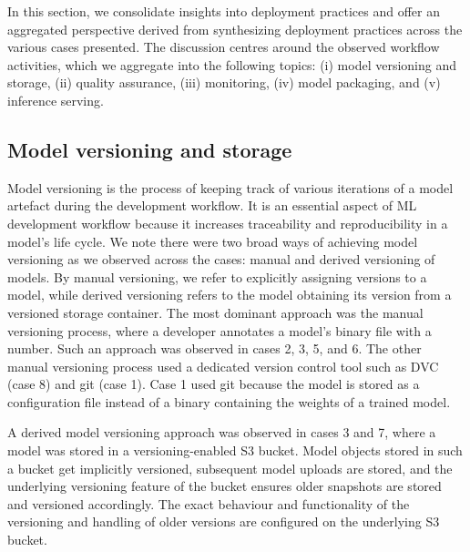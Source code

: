 In this section, we consolidate insights into deployment practices and offer an aggregated perspective derived from synthesizing deployment practices across the various cases presented. The discussion centres around the observed workflow activities, which we aggregate into the following topics: (i) model versioning and storage, (ii) quality assurance, (iii) monitoring, (iv) model packaging, and (v) inference serving. 


\subsection{Model versioning and storage}
Model versioning is the process of keeping track of various iterations of a model artefact during the development workflow. It is an essential aspect of ML development workflow because it increases traceability and reproducibility in a model's life cycle. We note there were two broad ways of achieving model versioning as we observed across the cases: manual and derived versioning of models. By manual versioning, we refer to explicitly assigning versions to a model, while derived versioning refers to the model obtaining its version from a versioned storage container. The most dominant approach was the manual versioning process, where a developer annotates a model's binary file with a number. Such an approach was observed in cases 2, 3, 5, and 6. The other manual versioning process used a dedicated version control tool such as DVC (case 8) and git (case 1). Case 1 used git because the model is stored as a configuration file instead of a binary containing the weights of a trained model. 

A derived model versioning approach was observed in cases 3 and 7, where a model was stored in a versioning-enabled S3 bucket. Model objects stored in such a bucket get implicitly versioned, subsequent model uploads are stored, and the underlying versioning feature of the bucket ensures older snapshots are stored and versioned accordingly. The exact behaviour and functionality of the versioning and handling of older versions are configured on the underlying S3 bucket.

